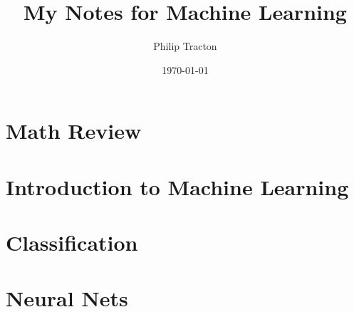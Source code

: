 \documentclass[12pt, svgnames, titlepage]{report}
\author{Philip Tracton}
\date{\today}
\date{}
\title{My Notes for Machine Learning}
\begin{document}
\maketitle
\newpage

\vspace{10mm}
\tableofcontents
\newpage

\chapter{Math Review}
\vspace{10mm}




\chapter{Introduction to Machine Learning}
\vspace{10mm}


\chapter{Classification}
\vspace{10mm}


\chapter{Neural Nets}
\vspace{10mm}

\end{document}
